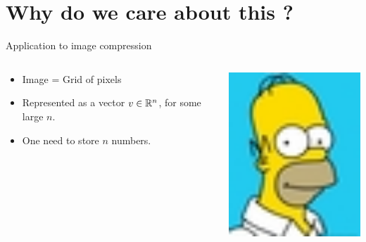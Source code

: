 \documentclass{beamer}
\begin{document}
\section{Why do we care about this ?}
\begin{frame}{Application to image compression}
	\vspace{-0.6cm}
	\begin{columns}
		\begin{column}{0.5\textwidth}
			\begin{itemize}
				\item Image = Grid of pixels
				\item Represented as a vector $v \in \mathbb{R}^n$, for some large $n$.
				\item One need to store $n$ numbers.
			\end{itemize}
		\end{column}
		\begin{column}{0.5\textwidth}
			\begin{center}
				\begin{image}
					\includegraphics[width=5.5cm]{./homer1.jpg}
					\caption{$n=44 \times 55 = 2420$}
				\end{image}
			\end{center}
		\end{column}
	\end{columns}
\end{frame}
\end{document}
